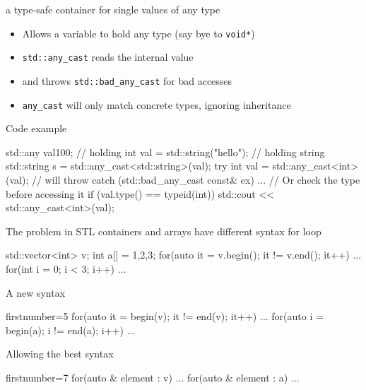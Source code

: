 \begin{frame}[fragile]
  \begin{block}{a type-safe container for single values of any type}
    \begin{itemize}
    \item Allows a variable to hold any type (say bye to \texttt{void*})
    \item \texttt{std::any_cast} reads the internal value
    \item and throws \texttt{std::bad_any_cast} for bad accesses
    \item \texttt{any_cast} will only match concrete types, ignoring inheritance
    \end{itemize}
  \end{block}
  \begin{exampleblock}{Code example}
    \small
    \begin{cppcode*}{}
      std::any val{100};          // holding int
      val = std::string("hello"); // holding string
      std::string s = std::any_cast<std::string>(val);
      try {
        int val = std::any_cast<int>(val); // will throw
      } catch (std::bad_any_cast const& ex) {...}
      // Or check the type before accessing it
      if (val.type() == typeid(int))
        std::cout << std::any_cast<int>(val);
    \end{cppcode*}
  \end{exampleblock}
\end{frame}

\begin{frame}[fragile]
  \begin{alertblock}{The problem in }
    STL containers and arrays have different syntax for loop
    \vspace{-1mm}
    \begin{cppcode*}{}
      std::vector<int> v;
      int a[] = {1,2,3};
      for(auto it = v.begin(); it != v.end(); it++) {...}
      for(int i = 0; i < 3; i++) {...}
    \end{cppcode*}
  \end{alertblock}
  \pause
  \begin{block}{A new syntax}
    \begin{cppcode*}{firstnumber=5}
      for(auto it = begin(v); it != end(v); it++) {...}
      for(auto i = begin(a); i != end(a); i++) {...}
    \end{cppcode*}
  \end{block}
  \pause
  \begin{exampleblock}{Allowing the best syntax}
    \begin{cppcode*}{firstnumber=7}
      for(auto & element : v) {...}
      for(auto & element : a) {...}
    \end{cppcode*}
  \end{exampleblock}
\end{frame}

